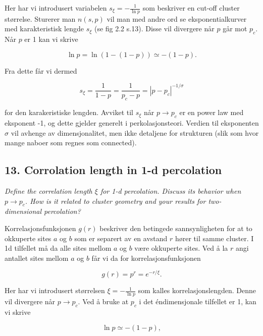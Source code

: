 \documentclass[a4paper,10pt]{article}
\begin{document}
Her har vi introdusert variabelen $s_{\xi} = -\frac{1}{\ln p}$ som beskriver en cut-off cluster størrelse. Sturerer man $n(s,p)$ vil man med andre ord se eksponentialkurver med karakteristisk lengde $s_{\xi}$ (se fig 2.2 s.13). Disse vil divergere når $p$ går mot $p_c$. Når $p$ er 1 kan vi skrive

\begin{equation}
 \ln p = \ln(1-(1-p)) \simeq -(1-p).
\end{equation}

Fra dette får vi dermed

\begin{equation}
 s_{\xi} = \frac{1}{1-p} = \frac{1}{p_c-p} = |p-p_c|^{-1/\sigma}
\end{equation}

for den karakeristiske lengden. Avviket til $s_{\xi}$ når $p\rightarrow p_c$ er en power law med eksponent -1, og dette gjelder generelt i perkolasjonsteori. Verdien til eksponenten $\sigma$ vil avhenge av dimensjonalitet, men ikke detaljene for strukturen (slik som hvor mange naboer som regnes som connected). 




\subsection*{13. Corrolation length in 1-d percolation}
\textit{Define the correlation length $\xi$ for 1-d percolation. Discuss its behavior when
$p \rightarrow p_c$. How is it related to cluster geometry and your results for two-
dimensional percolation?}

Korrelasjonsfunksjonen $g(r)$ beskriver den betingede sannsynligheten for at to okkuperte sites $a$ og $b$ som er  separert av en avstand $r$ hører til samme cluster. I 1d tilfellet må da alle sites mellom $a$ og $b$ være okkuperte sites. Ved å la $r$ angi antallet sites mellom $a$ og $b$ får vi da for korrelasjonsfunksjonen 

\begin{equation}
 g(r) = p^r = e^{-r/\xi}.
\end{equation}

Her har vi introdusert størrelsen $\xi = -\frac{1}{\ln p}$ som kalles korrelasjonslengden. Denne vil divergere når $p\rightarrow p_c$. Ved å bruke at $p_c$ i det éndimensjonale tilfellet er 1, kan vi skrive 

\begin{equation}
 \ln p \simeq -(1-p),
\end{equation}
\end{document}
